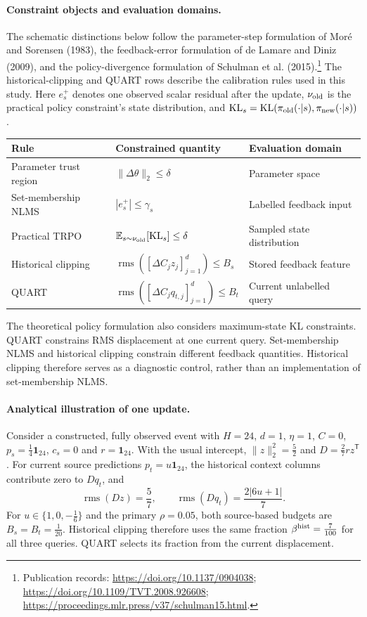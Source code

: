 \documentclass[11pt,a4paper]{article}
\newcommand{\rms}{\operatorname{rms}}
\begin{document}
\paragraph{Constraint objects and evaluation domains.}
The schematic distinctions below follow the parameter-step formulation of Mor{\'e} and Sorensen (1983), the feedback-error formulation of de Lamare and Diniz (2009), and the policy-divergence formulation of Schulman et al. (2015).\footnote{Publication records: \url{https://doi.org/10.1137/0904038}; \url{https://doi.org/10.1109/TVT.2008.926608}; \url{https://proceedings.mlr.press/v37/schulman15.html}.} The historical-clipping and QUART rows describe the calibration rules used in this study. Here $e_s^+$ denotes one observed scalar residual after the update, $\nu_{\rm old}$ is the practical policy constraint's state distribution, and $\mathrm{KL}_s=\mathrm{KL}(\pi_{\rm old}(\cdot|s),\pi_{\rm new}(\cdot|s))$.

\begin{center}
\small
\begin{tabular}{p{.23\linewidth}p{.39\linewidth}p{.29\linewidth}}
\toprule
Rule & Constrained quantity & Evaluation domain\\
\midrule
Parameter trust region & $\|\Delta\theta\|_2\leq\delta$ & Parameter space\\[3pt]
Set-membership NLMS & $|e_s^+|\leq\gamma_s$ & Labelled feedback input\\[3pt]
Practical TRPO & $\mathbb E_{s\sim\nu_{\rm old}}[\mathrm{KL}_s]\leq\delta$ & Sampled state distribution\\[3pt]
Historical clipping & $\rms([\Delta C_jz_j]_{j=1}^d)\leq B_s$ & Stored feedback feature\\[3pt]
QUART & $\rms([\Delta C_jq_{t,j}]_{j=1}^d)\leq B_t$ & Current unlabelled query\\
\bottomrule
\end{tabular}
\end{center}

The theoretical policy formulation also considers maximum-state KL constraints. QUART constrains RMS displacement at one current query. Set-membership NLMS and historical clipping constrain different feedback quantities. Historical clipping therefore serves as a diagnostic control, rather than an implementation of set-membership NLMS.

\paragraph{Analytical illustration of one update.}
Consider a constructed, fully observed event with $H=24$, $d=1$, $\eta=1$, $C=0$, $p_s=\tfrac14\mathbf1_{24}$, $c_s=0$ and $r=\mathbf1_{24}$. With the usual intercept, $\|z\|_2^2=\tfrac52$ and $D=\tfrac27rz^{\mathsf T}$. For current source predictions $p_t=u\mathbf1_{24}$, the historical context columns contribute zero to $Dq_t$, and
\[
 \rms(Dz)=\frac57,\qquad
 \rms(Dq_t)=\frac{2|6u+1|}{7}.
\]
For $u\in\{1,0,-\tfrac16\}$ and the primary $\rho=0.05$, both source-based budgets are $B_s=B_t=\tfrac1{20}$. Historical clipping therefore uses the same fraction $\beta^{\rm hist}=\tfrac7{100}$ for all three queries. QUART selects its fraction from the current displacement.
\end{document}
